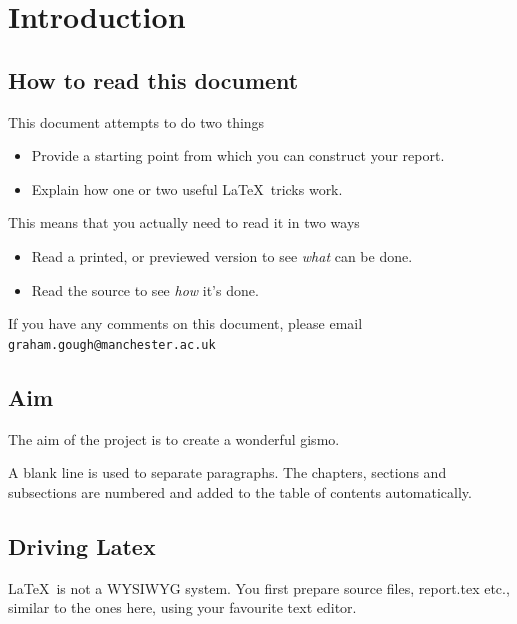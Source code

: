 \chapter{Introduction}\label{cha:int}

\section{How to read this document}
This document attempts to do two things
\begin{itemize}
\item Provide a starting point from which you can construct your
  report.
\item Explain how one or two useful \LaTeX\ tricks work.
\end{itemize}
This means that you actually need to read it in two ways
\begin{itemize}
\item Read a printed, or previewed version to see \emph{what} can be done.
\item Read the source to see \emph{how} it's done.
\end{itemize}
If you have any comments on this document, please email \texttt{graham.gough@manchester.ac.uk}

\section{Aim}\label{sec:aim}

The aim of the project is to create a wonderful gismo.

A blank line is used to separate paragraphs. The chapters, sections
and subsections are numbered and added to the table of contents
automatically.

\section{Driving Latex}

\LaTeX\ is not a WYSIWYG system. You first prepare source files,
\textsf{report.tex} etc., similar to the ones here, using your
favourite text editor.

